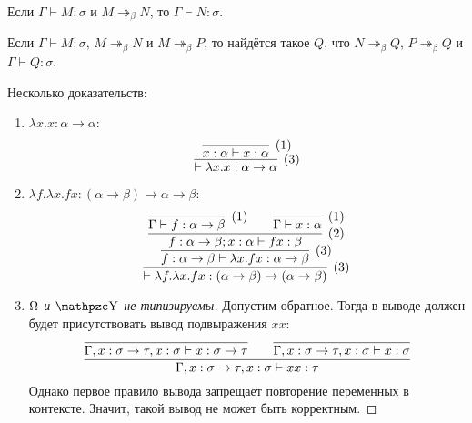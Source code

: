 \begin{corollary}
    Если $\Gamma \vdash M : \sigma$ и $M \twoheadrightarrow_{\beta}N$, то $\Gamma \vdash N : \sigma$.
\end{corollary}

\begin{theorem}
    Если $\Gamma \vdash M : \sigma$, $M \twoheadrightarrow_{\beta} N$ и $M \twoheadrightarrow_{\beta} P$, то найдётся такое $Q$, что
    $N \twoheadrightarrow_{\beta} Q$, $P \twoheadrightarrow_{\beta} Q$ и $\Gamma \vdash Q : \sigma$.
\end{theorem}

\begin{example} Несколько доказательств:
    \begin{enumerate}
        \item $\lambda x . x : \alpha \rightarrow \alpha$:
        \[
            \infer[(3)]
                {\vdash \lambda x . x : \alpha \rightarrow \alpha}
                { \infer[(1)]
                    {x : \alpha \vdash x : \alpha}
                    {}
                }
        \]

        \item $\lambda f . \lambda x . f x : (\alpha \rightarrow \beta) \rightarrow \alpha \rightarrow \beta$:
        \[
            \infer[(3)]
                { \vdash \lambda f . \lambda x . f x : (\alpha \rightarrow \beta) \rightarrow (\alpha \rightarrow \beta) }
                { \infer[(3)]
                    { f : \alpha \rightarrow \beta \vdash \lambda x . f x : \alpha \rightarrow \beta }
                    { \infer[(2)]
                        {f : \alpha \rightarrow \beta; x : \alpha \vdash f x : \beta}
                        {
                            \infer[(1)]{ \Gamma \vdash f : \alpha \rightarrow \beta }{} &&
                            \infer[(1)]{ \Gamma \vdash x : \alpha }{}
                        }
                    }
                }
        \]

        \item \begin{proof}[$\operatorname{\Omega}$ и $\comb Y$ не типизируемы] Допустим обратное.
        Тогда в выводе должен будет присутствовать вывод подвыражения $xx$:
        \[
            \infer{\Gamma, x : \sigma \rightarrow \tau, x : \sigma \vdash x x : \tau}
            {  \infer{\Gamma, x : \sigma \rightarrow \tau, x : \sigma \vdash x : \sigma \rightarrow \tau}{}
            && \infer{\Gamma, x : \sigma \rightarrow \tau, x : \sigma \vdash x : \sigma}{}
            }
        \]
        Однако первое правило вывода запрещает повторение переменных в контексте. Значит, такой вывод не может быть корректным.
        \end{proof}

    \end{enumerate}
\end{example}

